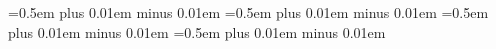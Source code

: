 \usepackage{xpatch}%
\xapptocmd\normalsize{%
\abovedisplayskip=0.5em plus 0.01em minus 0.01em
\abovedisplayshortskip=0.5em plus 0.01em minus 0.01em
\belowdisplayskip=0.5em plus 0.01em minus 0.01em
\belowdisplayshortskip=0.5em plus 0.01em minus 0.01em
}{}{}



